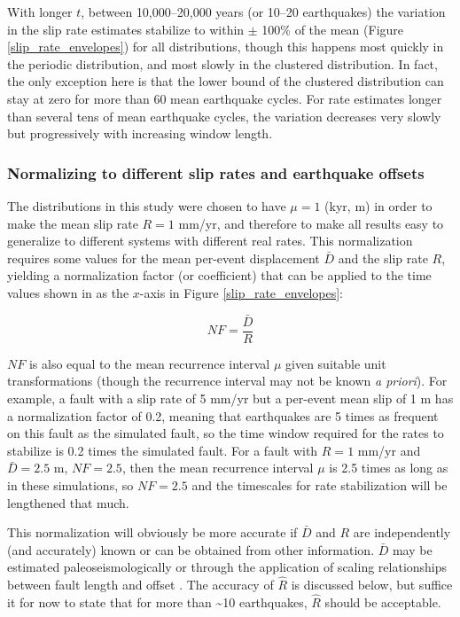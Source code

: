 \documentclass[se, manuscript]{copernicus}
\begin{document}
With longer \(t\), between 10,000--20,000 years (or 10--20 earthquakes)
the variation in the slip rate estimates stabilize to within \(\pm\)
100\% of the mean (Figure \ref{slip_rate_envelopes}) for all
distributions, though this happens most quickly in the periodic
distribution, and most slowly in the clustered distribution. In fact,
the only exception here is that the lower bound of the clustered
distribution can stay at zero for more than 60 mean earthquake cycles.
For rate estimates longer than several tens of mean earthquake cycles,
the variation decreases very slowly but progressively with increasing
window length.

\subsubsection{Normalizing to different slip rates and earthquake
offsets}\label{normalizing-to-different-slip-rates-and-earthquake-offsets}

The distributions in this study were chosen to have \(\mu=1\) (kyr, m)
in order to make the mean slip rate \(R=1\) mm/yr, and therefore to make
all results easy to generalize to different systems with different real
rates. This normalization requires some values for the mean per-event
displacement \(\bar{D}\) and the slip rate \(R\), yielding a
normalization factor (or coefficient) that can be applied to the time
values shown in as the \(x\)-axis in Figure \ref{slip_rate_envelopes}:

\begin{equation}
  NF = \frac{\bar{D}}{R}
  \label{norm_eqn}
\end{equation}

\(NF\) is also equal to the mean recurrence interval \(\mu\) given
suitable unit transformations (though the recurrence interval may not be
known \emph{a priori}). For example, a fault with a slip rate of 5 mm/yr
but a per-event mean slip of 1 m has a normalization factor of 0.2,
meaning that earthquakes are 5 times as frequent on this fault as the
simulated fault, so the time window required for the rates to stabilize
is 0.2 times the simulated fault. For a fault with \(R=1\) mm/yr and
\(\bar{D}=2.5\) m, \(NF=2.5\), then the mean recurrence interval \(\mu\)
is 2.5 times as long as in these simulations, so \(NF=2.5\) and the
timescales for rate stabilization will be lengthened that much.

This normalization will obviously be more accurate if \(\bar{D}\) and \(R\) are
independently (and accurately) known or can be obtained from other information.
\(\bar{D}\) may be estimated paleoseismologically or through the application of
scaling relationships between fault length and offset
\citep{wells_new_1994,leonard_earthquake_2010}. The accuracy of \(\hat{R}\) is
discussed below, but suffice it for now to state that for more than
\textasciitilde{}10 earthquakes, \(\hat{R}\) should be acceptable.
\end{document}
